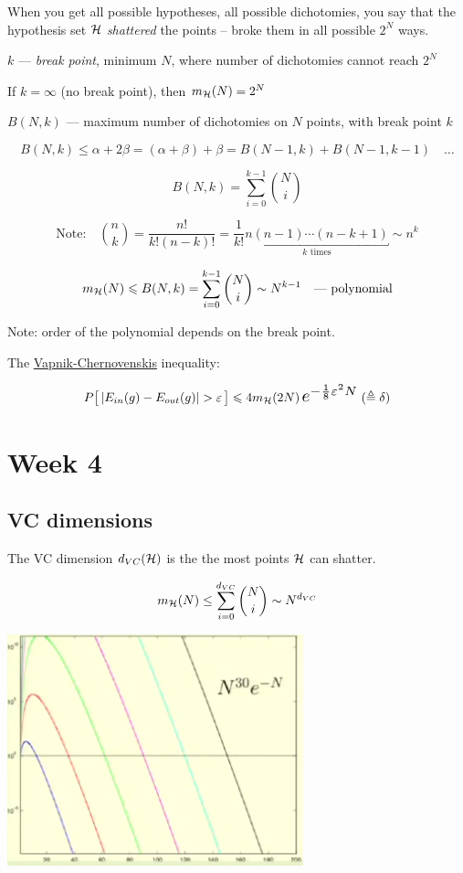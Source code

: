 \documentclass[a4paper,11pt]{article}
\begin{document}
When you get all possible hypotheses, all possible dichotomies,
you say that the hypothesis set $\mathcal{H}$ \emph{shattered} the points --
broke them in all possible $2^N$ ways.

$k$ --- \emph{break point}, minimum $N$, where number of dichotomies cannot reach $2^N$

If $k=\infty$ (no break point), then $m_{\mathcal{H}}(N) = 2^N$

$B(N,k)$ --- maximum number of dichotomies on $N$ points, with break point $k$

\[ B(N,k) \leq \alpha+2\beta = (\alpha+\beta) + \beta = B(N-1,k) + B(N-1,k-1) \quad\ldots \]

\[ B(N,k) = \sum_{i=0}^{k-1} \binom{N}{i} \]

\[ \text{Note:}\quad
   \binom{n}{k} = \frac{n!}{k!(n-k)!}
   = \frac{1}{k!} \underbracket{ n(n-1)\cdots(n-k+1) }_{k\text{ times}} \sim n^k \]

\[ m_{\mathcal{H}}(N) \leqslant B(N,k) = \sum_{i=0}^{k-1} \binom{N}{i} \sim N^{k-1}
   \quad\text{--- polynomial} \]

Note: order of the polynomial depends on the break point.

The \href{https://en.wikipedia.org/wiki/Vapnik%E2%80%93Chervonenkis_theory}{Vapnik-Chernovenskis} inequality:

\[ P \big[\, |\iiEin(g) - \iiEout(g)| > \varepsilon \,\big] \leqslant
   4 \iimH(2N) \, \scalebox{1.4}{$ e^{-\frac18 \varepsilon^2 N} $}
   \; (\triangleq \delta) \]

\section{Week 4}

\subsection{VC dimensions}

\def\iidvc{d_{VC}}

The VC dimension $\iidvc(\iiH)$ is the the most points $\mathcal{H}$ can shatter.

\[ m_{\mathcal{H}}(N) \leq \sum_{i=0}^{d_{VC}} \binom{N}{i} \sim N^{d_{VC}} \]

\includegraphics[scale=1]{plot_n^d_e^-n.png}
\end{document}
